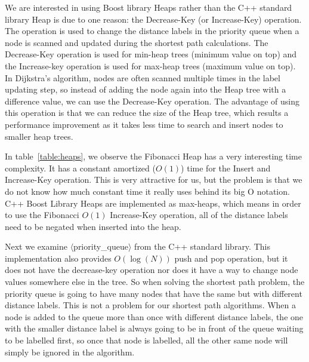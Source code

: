 We are interested in using Boost library Heaps rather than the C++ standard library Heap is due to one reason:
the Decrease-Key (or Increase-Key) operation.
The operation is used to change the distance labels in the priority queue when a node is scanned and updated during the shortest path calculations.
The Decrease-Key operation is used for min-heap trees (minimum value on top) and the Increase-key operation is used for max-heap trees (maximum value on top).
In Dijkstra's algorithm,
nodes are often scanned multiple times in the label updating step,
so instead of adding the node again into the Heap tree with a difference value,
we can use the Decrease-Key operation.
The advantage of using this operation is that we can reduce the size of the Heap tree, which results a performance improvement as it takes less time to search and insert nodes to smaller heap trees.

In table~\ref{table:heaps},
we observe the Fibonacci Heap has a very interesting time complexity.
It has a constant amortized ($O(1)$) time for the Insert and Increase-Key operation.
This is very attractive for us,
but the problem is that we do not know how much constant time it really uses behind its big O notation.
C++ Boost Library Heaps are implemented as max-heaps,
which means in order to use the Fibonacci $O(1)$ Increase-Key operation,
all of the distance labels need to be negated when inserted into the heap.

Next we examine $\langle$priority\_queue$\rangle$ from the C++ standard library.
This implementation also provides $O(\log(N))$ push and pop operation,
but it does not have the decrease-key operation nor does it have a way to change node values somewhere else in the tree.
So when solving the shortest path problem,
the priority queue is going to have many nodes that have the same but with different distance labels.
This is not a problem for our shortest path algorithms.
When a node is added to the queue more than once with different distance labels,
the one with the smaller distance label is always going to be in front of the queue waiting to be labelled first,
so once that node is labelled,
all the other same node will simply be ignored in the algorithm.

